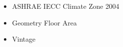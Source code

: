 \begin{itemize}
\item ASHRAE IECC Climate Zone 2004
\item Geometry Floor Area
\item Vintage
\end{itemize}
